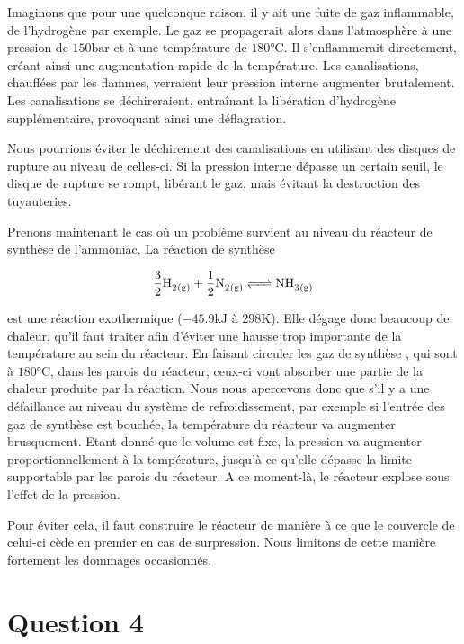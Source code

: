 \documentclass[a4paper,oneside,12pt]{article}
\begin{document}
Imaginons que pour une quelconque raison, il y ait une fuite de gaz inflammable, 
de l'hydrogène par exemple. Le gaz se propagerait alors dans l'atmosphère à 
une pression de $150\si{\bar}$ et à une température de $180\si{\celsius}$. 
Il s'enflammerait directement, créant ainsi une augmentation rapide de la température. 
Les canalisations, chauffées par les flammes, verraient leur pression interne augmenter 
brutalement. Les canalisations se déchireraient, entraînant la libération d'hydrogène 
supplémentaire, provoquant ainsi une déflagration.

Nous pourrions éviter le déchirement des canalisations en utilisant des disques de rupture 
au niveau de celles-ci. Si la pression interne dépasse un certain seuil, le disque de rupture 
se rompt, libérant le gaz, mais évitant la destruction des tuyauteries.
\newline

Prenons maintenant le cas où un problème survient au niveau du réacteur de synthèse 
de l'ammoniac. La réaction de synthèse

\begin{equation}
	\ce{\frac{3}{2} H2_{(g)} + \frac{1}{2} N2_{(g)} <=> NH3_{(g)}}
	\label{eq:synthesis}
\end{equation}

est une réaction exothermique ($-45.9\si{\kilo\joule}$ à $298\si{\kelvin}$). 
Elle dégage donc beaucoup de chaleur, qu'il faut traiter afin d'éviter 
une hausse trop importante de la température au sein du réacteur. 
En faisant circuler les gaz de synthèse ,  
qui sont à $180\si{\celsius}$, dans les parois du réacteur, 
ceux-ci vont absorber une partie de la chaleur produite par la réaction. 
Nous nous apercevons donc que s'il y a une défaillance au niveau du système 
de refroidissement, par exemple si l'entrée des gaz de synthèse est bouchée, 
la température du réacteur va augmenter brusquement. Etant donné que le volume est fixe, 
la pression va augmenter proportionnellement à la température, 
jusqu'à ce qu'elle dépasse la limite supportable par les parois du réacteur. 
A ce moment-là, le réacteur explose sous l'effet de la pression.
\newline

Pour éviter cela, il faut construire le réacteur de manière à ce que 
le couvercle de celui-ci cède en premier en cas de surpression. 
Nous limitons de cette manière fortement les dommages occasionnés.

\section*{Question 4}
\end{document}
